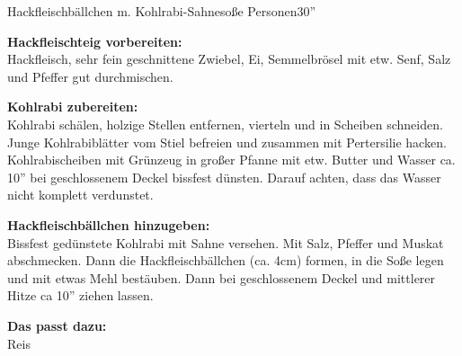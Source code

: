 \begin{MyRecipe}{Hackfleischbällchen m. Kohlrabi-Sahnesoße}{ Personen}{30''}
	
	
	\textbf{Hackfleischteig vorbereiten:}\\
	Hackfleisch, sehr fein geschnittene Zwiebel, Ei, Semmelbrösel mit etw. Senf, Salz und Pfeffer gut durchmischen.\par\bigskip
	

	\textbf{Kohlrabi zubereiten:}\\
	Kohlrabi schälen, holzige Stellen entfernen, vierteln und in Scheiben schneiden. Junge Kohlrabiblätter vom Stiel befreien und zusammen mit Pertersilie hacken. Kohlrabischeiben mit Grünzeug in großer Pfanne mit etw. Butter und Wasser ca. 10'' bei geschlossenem Deckel bissfest dünsten. Darauf achten, dass das Wasser nicht komplett verdunstet.\par\bigskip
	
	
	\textbf{Hackfleischbällchen hinzugeben:}\\
	Bissfest gedünstete Kohlrabi mit Sahne versehen. Mit Salz, Pfeffer und Muskat abschmecken. Dann die Hackfleischbällchen (ca. 4cm) formen, in die Soße legen und mit etwas Mehl bestäuben. Dann bei geschlossenem Deckel und mittlerer Hitze ca 10'' ziehen lassen.\par\bigskip
	
	\textbf{Das passt dazu:}\\
	Reis
	
\end{MyRecipe}